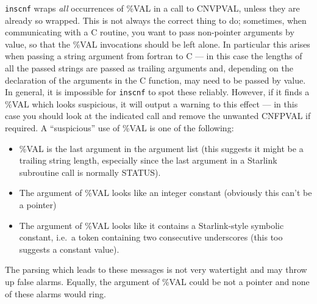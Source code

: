 \documentclass[twoside,11pt]{article}
\renewcommand{\_}{\texttt{\symbol{95}}}
\begin{document}
{\tt inscnf} wraps {\it all\/} occurrences of \%VAL in a call to CNV\_PVAL,
unless they are already so wrapped.
This is not always the correct thing to do; sometimes, when communicating
with a C routine, you want to pass non-pointer arguments by value,
so that the \%VAL invocations should be left alone.
In particular this arises when passing a string argument from fortran
to C --- in this case the lengths of all the passed strings are passed
as trailing arguments and, depending on the declaration of the arguments
in the C function, may need to be passed by value.
In general, it is impossible for {\tt inscnf} to spot these reliably.
However, if it finds a \%VAL which looks suspicious, it will output
a warning to this effect --- in this case you should look at the 
indicated call and remove the unwanted CNF\_PVAL if required.
A ``suspicious'' use of \%VAL is one of the following:
\begin{itemize}
\item
\%VAL is the last argument in the argument list (this suggests it might
be a trailing string length, especially since the last argument in a 
Starlink subroutine call is normally STATUS).
\item
The argument of \%VAL looks like an integer constant (obviously this can't
be a pointer)
\item
The argument of \%VAL looks like it contains a Starlink-style 
symbolic constant, i.e.\ a token containing two consecutive underscores
(this too suggests a constant value).
\end{itemize}
The parsing which leads to these messages is not very watertight and
may throw up false alarms.
Equally, the argument of \%VAL could be not a pointer and none of 
these alarms would ring.
\end{document}
